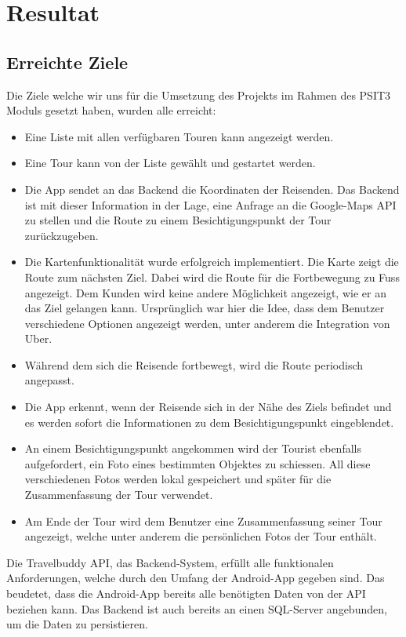 \section{Resultat}\label{resultat}

\subsection{Erreichte Ziele}\label{erreichteZiele}

Die Ziele welche wir uns für die Umsetzung des Projekts im Rahmen des PSIT3 Moduls gesetzt haben, wurden alle erreicht:
\begin{itemize}
  \item Eine Liste mit allen verfügbaren Touren kann angezeigt werden.
  \item Eine Tour kann von der Liste gewählt und gestartet werden.
  \item Die App sendet an das Backend die Koordinaten der Reisenden. Das Backend ist mit dieser Information in der Lage, eine Anfrage an die Google-Maps API zu stellen und die Route zu einem Besichtigungspunkt der Tour zurückzugeben.
  \item Die Kartenfunktionalität wurde erfolgreich implementiert. Die Karte zeigt die Route zum nächsten Ziel. Dabei wird die Route für die Fortbewegung zu Fuss angezeigt. Dem Kunden wird keine andere Möglichkeit angezeigt, wie er an das Ziel gelangen kann. Ursprünglich war hier die Idee, dass dem Benutzer verschiedene Optionen angezeigt werden, unter anderem die Integration von Uber.
  \item Während dem sich die Reisende fortbewegt, wird die Route periodisch angepasst.
  \item Die App erkennt, wenn der Reisende sich in der Nähe des Ziels befindet und es werden sofort die Informationen zu dem Besichtigungspunkt eingeblendet.
  \item An einem Besichtigungspunkt angekommen wird der Tourist ebenfalls aufgefordert, ein Foto eines bestimmten Objektes zu schiessen. All diese verschiedenen Fotos werden lokal gespeichert und später für die Zusammenfassung der Tour verwendet.
  \item Am Ende der Tour wird dem Benutzer eine Zusammenfassung seiner Tour angezeigt, welche unter anderem die persönlichen Fotos der Tour enthält.
\end{itemize}

Die Travelbuddy API, das Backend-System, erfüllt alle funktionalen Anforderungen, welche durch den Umfang der Android-App gegeben sind. Das beudetet, dass die Android-App bereits alle benötigten Daten von der API beziehen kann. Das Backend ist auch bereits an einen SQL-Server angebunden, um die Daten zu persistieren.


